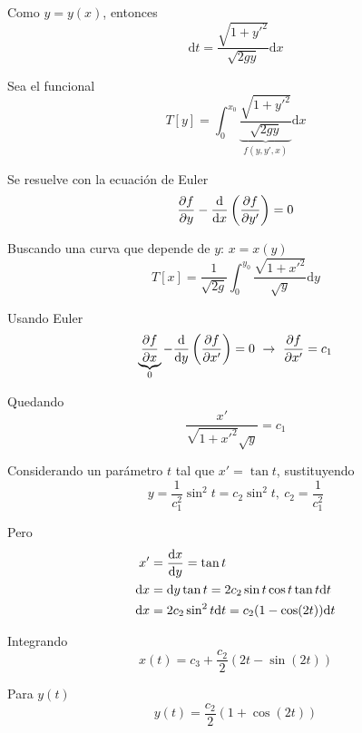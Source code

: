 \documentclass[../main]{subfiles}
\begin{document}
Como $y=y(x)$, entonces
\begin{equation}
    \mathrm{d}t=\dfrac{\sqrt{1+y'^2}}{\sqrt{2gy}}\mathrm{d}x
\end{equation}

Sea el funcional
\begin{equation}
    T[y]=\int_0^{x_0} \underbrace{\dfrac{\sqrt{1+y'^2}}{\sqrt{2gy}}}_{f(y,y',x)}\mathrm{d}x
\end{equation}

Se resuelve con la ecuación de Euler
\begin{equation}
    \pdv{f}{y}-\dv{}{x}\left(\pdv{f}{y'}\right)=0
\end{equation}

Buscando una curva que depende de $y$: $x=x(y)$
\begin{equation}
    T[x]=\dfrac{1}{\sqrt{2g}}\int_0^{y_0} \dfrac{\sqrt{1+x'^2}}{\sqrt{y}}\mathrm{d}y
\end{equation}

Usando Euler
\begin{equation}
    \underbrace{\pdv{f}{x}}_{0}-\dv{}{y}\left(\pdv{f}{x'}\right)=0 \ \rightarrow \ \pdv{f}{x'}=c_1
\end{equation}

Quedando
\begin{equation}
    \dfrac{x'}{\sqrt{1+x'^2}\sqrt{y}}=c_1
\end{equation}

Considerando un parámetro $t$ tal que $x'=\tan t$, sustituyendo
\begin{equation}
    y=\dfrac{1}{c_1^2}\sin^2 t=c_2\sin^2 t, \ c_2=\dfrac{1}{c_1^2}
\end{equation}

Pero
\begin{equation}
    \begin{split}
        x'&=\dv{x}{y}=\tan t \\
        \mathrm{d}x&=\mathrm{d}y\tan t=2c_2 \sin t\cos t\tan t \mathrm{d}t\\
        \mathrm{d}x&=2c_2 \sin^2 t \mathrm{d}t=c_2(1-\cos(2t))\mathrm{d}t
    \end{split}
\end{equation}

Integrando
\begin{equation}
    x(t)=c_3+\dfrac{c_2}{2}(2t-\sin(2t))
\end{equation}

Para $y(t)$
\begin{equation}
    y(t)=\dfrac{c_2}{2}(1+\cos(2t))
\end{equation}
\end{document}

